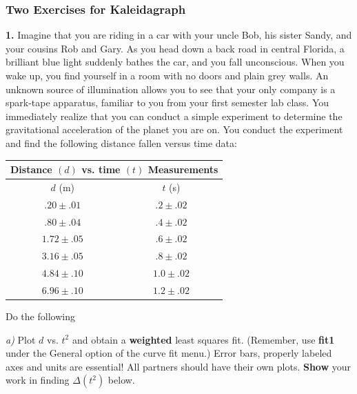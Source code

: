 \subsubsection{Two Exercises for Kaleidagraph}
\noindent
{\bf 1.} Imagine that you are riding in a car with your uncle Bob, his sister 
Sandy, and your cousins Rob and Gary. As you head down a back road in 
central Florida, a brilliant blue light suddenly bathes the car, and you
fall unconscious. When you wake up, you find yourself in a room with no 
doors and plain grey walls. An unknown source of illumination allows you
to see that your only company is a spark-tape apparatus, familiar to you
from your first semester lab class. You immediately realize that you can
conduct a simple experiment to determine the gravitational acceleration of 
the planet you are on. You conduct the experiment and find the following
distance fallen versus time data:

\vspace*{0.5cm}
\begin{center}
\begin{tabular}{|c|c|}
\hline
\multicolumn{2}{|c|}{Distance $(d)$ vs. time $(t)$ Measurements} \\
\hline\hline
$d$ (m) & $t$ (s) \\
\hline
  $.20 \pm .01$      &   $.2 \pm .02$   \\
\hline    
  $.80 \pm .04$      &   $.4 \pm .02$   \\
\hline
  $1.72 \pm .05$     &   $.6 \pm .02$   \\
\hline
  $3.16\pm .05$     &  $.8 \pm .02$    \\
\hline
  $4.84 \pm .10$     &  $ 1.0 \pm .02$    \\
\hline
  $6.96 \pm .10$      & $ 1.2 \pm .02$     \\
\hline
\end{tabular}
\end{center}

\vspace*{0.5cm}
\noindent
Do the following

{\it a)} Plot $d$ vs. $t^2$ and obtain a {\bf weighted} least squares fit.
(Remember, use {\bf fit1} under the General option of the curve fit menu.)
Error bars, properly labeled axes and units are essential!  All partners 
should have their own plots.  {\bf Show}
your work in finding $\Delta(t^2)$ below. \\
\vspace*{2cm} \\

